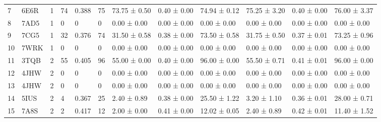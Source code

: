 \begin{table}[H]
{\begin{threeparttable}
\begin{tabular}{|p{0.3cm}|p{0.8cm}|p{0.2cm}|p{0.9cm}|p{0.9cm}|p{0.8cm}|p{1.6cm}|p{1.5cm}|p{1.7cm}|p{1.6cm}|p{1.5cm}|p{1.7cm}|}
7           & 6E6R            & 1                 & 74                        & 0.388            & 75                    & 73.75 ± 0.50          & 0.40 ± 0.00      & 74.94 ± 0.12                      & 75.25 ± 3.20          & 0.40 ± 0.00      & 76.00 ± 3.37                       \\
8           & 7AD5            & 1                 & 0                         & 0                & 0                     & 0.00 ± 0.00           & 0.00 ± 0.00      & 0.00 ± 0.00                       & 0.00 ± 0.00           & 0.00 ± 0.00      & 0.00 ± 0.00                        \\
9           & 7CG5            & 1                 & 32                        & 0.376            & 74                    & 31.50 ± 0.58          & 0.38 ± 0.00      & 73.50 ± 0.58                      & 31.75 ± 0.50          & 0.37 ± 0.01      & 73.25 ± 0.96                       \\
10          & 7WRK            & 1                 & 0                         & 0                & 0                     & 0.00 ± 0.00           & 0.00 ± 0.00      & 0.00 ± 0.00                       & 0.00 ± 0.00           & 0.00 ± 0.00      & 0.00 ± 0.00                        \\ 
\hline \hline
11          & 3TQB            & 2                 & 55                        & 0.405            & 96                    & 55.00 ± 0.00          & 0.40 ± 0.00      & 96.00 ± 0.00                      & 55.50 ± 0.71          & 0.41 ± 0.01      & 96.00 ± 0.00                       \\
12          & 4JHW            & 2                 & 0                         & 0                & 0                     & 0.00 ± 0.00           & 0.00 ± 0.00      & 0.00 ± 0.00                       & 0.00 ± 0.00           & 0.00 ± 0.00      & 0.00 ± 0.00                        \\
13          & 4JHW            & 2                 & 0                         & 0                & 0                     & 0.00 ± 0.00           & 0.00 ± 0.00      & 0.00 ± 0.00                       & 0.00 ± 0.00           & 0.00 ± 0.00      & 0.00 ± 0.00                        \\
14          & 5IUS            & 2                 & 4                         & 0.367            & 25                    & 2.40 ± 0.89           & 0.38 ± 0.00      & 25.50 ± 1.22                      & 3.20 ± 1.10           & 0.36 ± 0.01      & 28.00 ± 0.71                       \\
15          & 7A8S            & 2                 & 2                         & 0.417            & 12                    & 2.00 ± 0.00           & 0.41 ± 0.00      & 12.02 ± 0.05                      & 2.40 ± 0.89           & 0.42 ± 0.01      & 11.40 ± 1.52                       \\

\end{tabular}
\end{threeparttable}}
\end{table}
